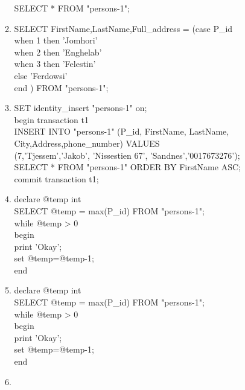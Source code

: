 \documentclass{article}
\begin{document}
\begin{enumerate}
\begin{enumerate}
                SELECT * FROM "persons-1";\\
            \item %

                SELECT  FirstName,LastName,Full\_address = (case P\_id \\
                when 1 then 'Jomhori' \\
                when 2 then 'Enghelab'\\
                when 3 then 'Felestin'\\
                else 'Ferdowsi'\\
                end ) FROM "persons-1";\\

            \item %

                SET identity\_insert "persons-1" on;\\
                begin transaction t1\\
                INSERT INTO "persons-1" (P\_id, FirstName, LastName, City,Address,phone\_number) VALUES \\
                (7,'Tjessem','Jakob', 'Nissestien 67', 'Sandnes','0017673276');\\
                SELECT * FROM "persons-1" ORDER BY FirstName ASC;\\
                commit transaction t1;\\
            \item %

                declare @temp int\\
                SELECT @temp = max(P\_id) FROM "persons-1";\\
                while @temp > 0\\
                begin\\
                print 'Okay';\\
                set @temp=@temp-1;\\
                end\\

            \item %
                declare @temp int\\
                SELECT @temp = max(P\_id) FROM "persons-1";\\
                while @temp > 0\\
                begin\\
                print 'Okay';\\
                set @temp=@temp-1;\\
                end\\
            \item %


\end{enumerate}
\end{enumerate}
\end{document}
